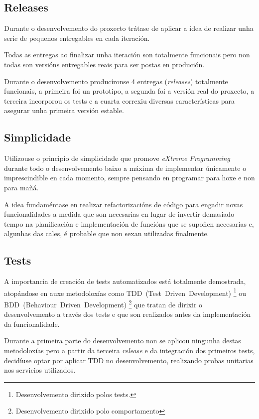     \subsection{Releases}
    Durante o desenvolvemento do proxecto trátase de aplicar a idea de realizar 
unha serie de pequenos entregables en cada iteración.

    Todas as entregas ao finalizar unha iteración son totalmente funcionais 
pero non todas son versións entregables reais para ser postas en produción.

    Durante o desenvolvemento producíronse 4 entregas (\emph{releases}) 
totalmente funcionais, a primeira foi un prototipo, a segunda foi a versión 
real do proxecto, a terceira incorporou os tests e a cuarta correxiu diversas 
características para asegurar unha primeira versión estable.

    \subsection{Simplicidade}
    Utilizouse o principio de simplicidade que promove \emph{eXtreme 
Programming} durante todo o desenvolvemento baixo a máxima de implementar 
únicamente o imprescindible en cada momento, sempre pensando en programar 
para hoxe e non para mañá.

    A idea fundaméntase en realizar refactorizacións de código para engadir 
novas funcionalidades a medida que son necesarias en lugar de invertir 
demasiado tempo na planificación e implementación de funcións que se supoñen 
necesarias e, algunhas das cales, é probable que non sexan utilizadas
finalmente.

    \subsection{Tests}
    A importancia de creación de tests automatizados está totalmente 
demostrada, atopándose en auxe metodoloxías como
TDD~(Test~Driven~Development)%
\footnote{Desenvolvemento dirixido polos tests.} %
ou BDD~(Behaviour~Driven~Development)%
\footnote{Desenvolvemento dirixido polo comportamento} %
que tratan de dirixir o desenvolvemento a través dos tests e
que son realizados antes da implementación da funcionalidade.

    Durante a primeira parte do desenvolvemento non se aplicou ningunha destas 
metodoloxías pero a partir da terceira \emph{release} e da integración 
dos primeiros tests, decidíuse optar por aplicar TDD no desenvolvemento, 
realizando probas unitarias nos servicios utilizados.

